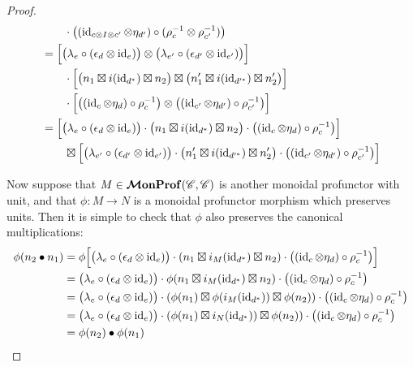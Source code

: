 \documentclass[12pt,oneside,article,draft]{memoir}
\begin{document}
\begin{proof}
\begin{align*}
      &\qquad \cdot\bigl((\operatorname{id}_{c\otimes I\otimes c'}\otimes\eta_{d'})\circ(\rho_c^{-1}\otimes\rho_{c'}^{-1})\bigr) \\
      &= \Bigl[\bigl(\lambda_e\circ(\epsilon_d\otimes\operatorname{id}_e)\bigr)\otimes\bigl(\lambda_{e'}\circ(\epsilon_{d'}\otimes\operatorname{id}_{e'})\bigr)\Bigr] \\
      &\qquad \cdot\Bigl[\bigl(n_1\boxtimes i(\operatorname{id}_{d^*})\boxtimes n_2\bigr)\boxtimes\bigl(n'_1\boxtimes i(\operatorname{id}_{d'^*})\boxtimes n'_2\bigr)\Bigr] \\
      &\qquad \cdot\Bigl[\bigl((\operatorname{id}_c\otimes\eta_d)\circ\rho_c^{-1}\bigr)\otimes\bigl((\operatorname{id}_{c'}\otimes\eta_{d'})\circ\rho_{c'}^{-1}\bigr)\Bigr] \\
      &= \Bigl[\bigl(\lambda_e\circ(\epsilon_d\otimes\operatorname{id}_e)\bigr)\cdot\bigl(n_1\boxtimes i(\operatorname{id}_{d^*})\boxtimes n_2\bigr)\cdot\bigl((\operatorname{id}_c\otimes\eta_d)\circ\rho_c^{-1}\bigr)\Bigr] \\
      &\qquad \boxtimes\Bigl[\bigl(\lambda_{e'}\circ(\epsilon_{d'}\otimes\operatorname{id}_{e'})\bigr)\cdot\bigl(n'_1\boxtimes i(\operatorname{id}_{d'^*})\boxtimes n'_2\bigr)\cdot\bigl((\operatorname{id}_{c'}\otimes\eta_{d'})\circ\rho_{c'}^{-1}\bigr)\Bigr]
   \end{align*}

   Now suppose that $M\in\bm{\mathcal{M}}\mathbf{onProf}(\mathscr{C},\mathscr{C})$ is another monoidal profunctor with unit, and that $\phi\colon M\to N$ is a monoidal profunctor morphism which preserves units.
   Then it is simple to check that $\phi$ also preserves the canonical multiplications:
   \begin{align*}
      \phi(n_2\bullet n_1) &= \phi\Bigl[\bigl(\lambda_e\circ(\epsilon_d\otimes\operatorname{id}_e)\bigr)\cdot(n_1\boxtimes i_M(\operatorname{id}_{d^*})\boxtimes n_2)\cdot\bigl((\operatorname{id}_c\otimes \eta_d)\circ\rho_c^{-1}\bigr)\Bigr] \\
      &= \bigl(\lambda_e\circ(\epsilon_d\otimes\operatorname{id}_e)\bigr)\cdot\phi(n_1\boxtimes i_M(\operatorname{id}_{d^*})\boxtimes n_2)\cdot\bigl((\operatorname{id}_c\otimes \eta_d)\circ\rho_c^{-1}\bigr) \\
      &= \bigl(\lambda_e\circ(\epsilon_d\otimes\operatorname{id}_e)\bigr)\cdot(\phi(n_1)\boxtimes \phi(i_M(\operatorname{id}_{d^*}))\boxtimes \phi(n_2))\cdot\bigl((\operatorname{id}_c\otimes \eta_d)\circ\rho_c^{-1}\bigr) \\
      &= \bigl(\lambda_e\circ(\epsilon_d\otimes\operatorname{id}_e)\bigr)\cdot(\phi(n_1)\boxtimes i_N(\operatorname{id}_{d^*}))\boxtimes \phi(n_2))\cdot\bigl((\operatorname{id}_c\otimes \eta_d)\circ\rho_c^{-1}\bigr) \\
      &= \phi(n_2)\bullet\phi(n_1)
   \end{align*}
\end{proof}
\end{document}
